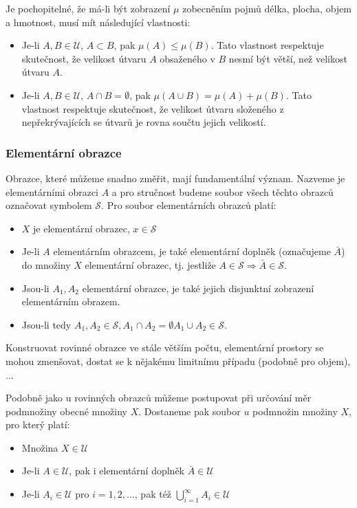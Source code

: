 	Je pochopitelné, že má-li být zobrazení $\mu$ zobecněním pojmů délka, plocha, objem a hmotnost, musí mít následující vlastnosti:
	\begin{itemize}
		\item Je-li $A,B\in\mathscr{U}$, $A\subset B$, pak $\mu(A)\leq\mu(B)$. Tato vlastnost respektuje skutečnost, že velikost útvaru $A$ obsaženého v $B$ nesmí být větší, než velikost útvaru $A$.
		\item Je-li $A,B\in\mathscr{U}$, $A\cap B = \emptyset$, pak $\mu(A\cup B)=\mu(A)+\mu(B)$. Tato vlastnost respektuje skutečnost, že velikost útvaru složeného z nepřekrývajících se útvarů je rovna součtu jejich velikostí.
	\end{itemize}	
	
	\subsubsection{Elementární obrazce}
	Obrazce, které můžeme snadno změřit, mají fundamentální význam. Nazveme je elementárními obrazci $A$ a pro stručnost budeme soubor všech těchto obrazců označovat symbolem $\mathscr{S}$. Pro soubor elementárních obrazců platí:
	
	\begin{itemize}[noitemsep]
	\item $X$ je elementární obrazec, $x\in\mathscr{S}$
	\item Je-li $A$ elementárním obrazcem, je také elementární doplněk (označujeme $\bar{A}$) do množiny $X$ elementární obrazec, tj. jestliže $A\in\mathscr{S}\Rightarrow \bar{A}\in\mathscr{S}$.
	\item Jsou-li $A_1, A_2$ elementární obrazce, je také jejich disjunktní zobrazení elementárním obrazem.
	\item Jsou-li tedy $A_1,A_2\in\mathscr{S}, A_1\cap A_2=\emptyset A_1\cup A_2\in\mathscr{S}$. 
	\end{itemize}
	
	Konstruovat rovinné obrazce ve stále větším počtu, elementární prostory se mohou zmenšovat, dostat se k nějakému limitnímu případu (podobně pro objem), ...\br
	
	Podobně jako u rovinných obrazců můžeme postupovat při určování měr podmnožiny obecné množiny $X$. Dostaneme pak soubor $u$ podmnožin množiny $X$, pro který platí:
	\begin{itemize}[noitemsep]
	\item Množina $X\in \mathscr{U}$
	\item Je-li $A\in\mathscr{U}$, pak i elementární doplněk $\bar{A}\in\mathscr{U}$
	\item Je-li $A_i\in \mathscr{U}$ pro $i=1,2,\ldots$, pak též $\displaystyle\bigcup_{i=1}^\infty A_i\in\mathscr{U}$
	\end{itemize}
	
